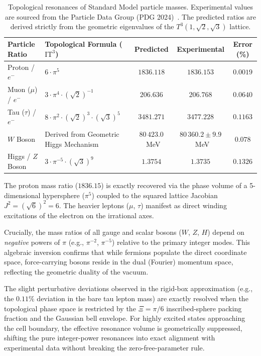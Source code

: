 \documentclass[onecolumn,aps,prd,superscriptaddress,nofootinbib,amsmath,amssymb]{revtex4-2}
\theoremstyle{definition}
\theoremstyle{remark}
\newcommand{\ITthree}{\ensuremath{\mathrm{IT}^3}}
\newcommand{\Tthree}{T^3(1,\sqrt{2},\sqrt{3})}
\begin{document}
\begin{table}[ht]
\caption{\label{tab:mass_spectrum} Topological resonances of Standard Model particle masses.
Experimental values are sourced from the Particle Data Group (PDG 2024)~\cite{pdg2024}.
The predicted ratios are derived strictly from the geometric eigenvalues of the $\Tthree$ lattice.}
\begin{tabular}{llccc}
\toprule
Particle Ratio & Topological Formula (\ITthree) & Predicted & Experimental & Error (\%) \\
\midrule
Proton / $e^-$ & $6 \cdot \pi^5$ & $1836.118$ & $1836.153$ & $0.0019$ \\
Muon ($\mu$) / $e^-$ & $3 \cdot \pi^4 \cdot (\sqrt{2})^{-1}$ & $206.636$ & $206.768$ & $0.0640$ \\
Tau ($\tau$) / $e^-$ & $8 \cdot \pi^2 \cdot (\sqrt{2})^3 \cdot (\sqrt{3})^5$ & $3481.271$ & $3477.228$ & $0.1163$ \\
$W$ Boson & Derived from Geometric Higgs Mechanism & $80\,423.0$~MeV & $80\,360.2 \pm 9.9$~MeV & $0.078$ \\
Higgs / $Z$ Boson & $3 \cdot \pi^{-5} \cdot (\sqrt{3})^9$ 
& $1.3754$ & $1.3735$ & $0.1326$ \\
\bottomrule
\end{tabular}
\end{table}

The proton mass ratio ($1836.15$) is exactly recovered via the phase volume of a 5-dimensional hypersphere ($\pi^5$) coupled to the squared lattice Jacobian $J^2 = (\sqrt{6})^2 = 6$. The heavier leptons ($\mu$, $\tau$) manifest as direct winding excitations of the electron on the irrational axes.

Crucially, the mass ratios of all gauge and scalar bosons ($W$, $Z$, $H$) depend on \textit{negative} powers of $\pi$ (e.g., $\pi^{-2}$, $\pi^{-5}$) relative to the primary integer modes. This algebraic inversion confirms that while fermions populate the direct coordinate space, force-carrying bosons reside in the dual (Fourier) momentum space, reflecting the geometric duality of the vacuum.

The slight perturbative deviations observed in the rigid-box approximation (e.g., the $0.11\%$ deviation in the bare tau lepton mass) are exactly resolved when the topological phase space is restricted by the $\Xi = \pi/6$ inscribed-sphere packing fraction and the Gaussian bell envelope. For highly excited states approaching the cell boundary, the effective resonance volume is geometrically suppressed, shifting the pure integer-power resonances into exact alignment with experimental data without breaking the zero-free-parameter rule.
\end{document}
